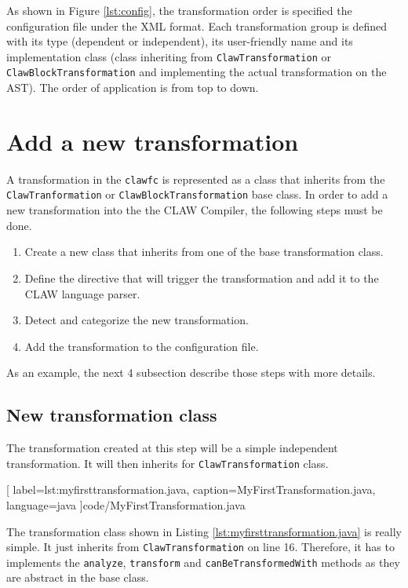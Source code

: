 \documentclass[a4paper, 11pt]{report}
\def\clawfc{\lstinline!clawfc!\xspace}
\begin{document}
As shown in Figure \ref{lst:config}, the transformation order is specified the
configuration file under the XML format.
Each transformation group is defined with its type (dependent or
independent), its user-friendly name and its implementation class (class
inheriting from \lstinline|ClawTransformation| or
\lstinline|ClawBlockTransformation| and implementing the actual transformation
on the AST). The order of application is from top to down.


\section{Add a new transformation}
A transformation in the \clawfc is represented as a class that inherits from
the \lstinline|ClawTranformation| or \lstinline|ClawBlockTransformation|
base class. In order to add a new transformation into the the CLAW Compiler,
the following steps must be done.

\begin{enumerate}
\item Create a new class that inherits from one of the base transformation
      class.
\item Define the directive that will trigger the transformation and add it
      to the CLAW language parser.
\item Detect and categorize the new transformation.
\item Add the transformation to the configuration file.
\end{enumerate}

As an example, the next 4 subsection describe those steps with more details.

\subsection{New transformation class}
The transformation created at this step will be a simple independent
transformation. It will then inherits for \lstinline|ClawTransformation| class.


  [
    label=lst:myfirsttransformation.java,
    caption=MyFirstTransformation.java,
    language=java
  ]{code/MyFirstTransformation.java}

The transformation class shown in Listing \ref{lst:myfirsttransformation.java}
is really simple. It just inherits from \lstinline|ClawTransformation| on line
16. Therefore, it has to implements the \lstinline|analyze|,
\lstinline|transform| and \lstinline|canBeTransformedWith| methods as they are
abstract in the base class.
\end{document}
